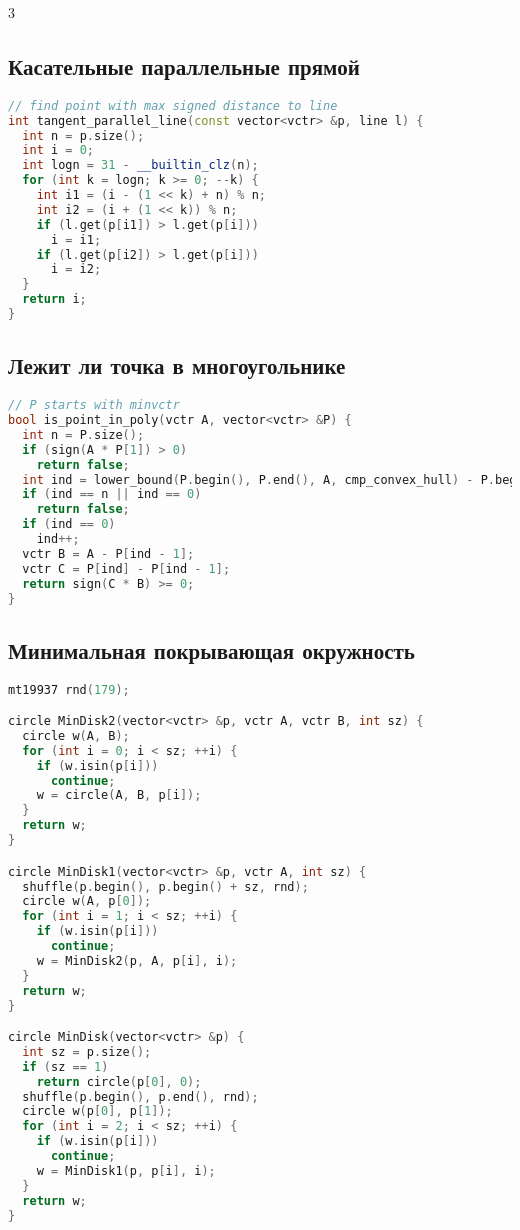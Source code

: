 \documentclass[10pt,a4paper,landscape,twosided]{extarticle}
\begin{document}
\begin{multicols*}{3}
\subsection{Касательные параллельные прямой}
\begin{lstlisting}[language=C++]
// find point with max signed distance to line
int tangent_parallel_line(const vector<vctr> &p, line l) {
  int n = p.size();
  int i = 0;
  int logn = 31 - __builtin_clz(n);
  for (int k = logn; k >= 0; --k) {
    int i1 = (i - (1 << k) + n) % n;
    int i2 = (i + (1 << k)) % n;
    if (l.get(p[i1]) > l.get(p[i]))
      i = i1;
    if (l.get(p[i2]) > l.get(p[i]))
      i = i2;
  }
  return i;
}

\end{lstlisting}

\subsection{Лежит ли точка в многоугольнике}
\begin{lstlisting}[language=C++]
// P starts with minvctr
bool is_point_in_poly(vctr A, vector<vctr> &P) {
  int n = P.size();
  if (sign(A * P[1]) > 0)
    return false;
  int ind = lower_bound(P.begin(), P.end(), A, cmp_convex_hull) - P.begin();
  if (ind == n || ind == 0)
    return false;
  if (ind == 0)
    ind++;
  vctr B = A - P[ind - 1];
  vctr C = P[ind] - P[ind - 1];
  return sign(C * B) >= 0;
}

\end{lstlisting}

\subsection{Минимальная покрывающая окружность}
\begin{lstlisting}[language=C++]
mt19937 rnd(179);

circle MinDisk2(vector<vctr> &p, vctr A, vctr B, int sz) {
  circle w(A, B);
  for (int i = 0; i < sz; ++i) {
    if (w.isin(p[i]))
      continue;
    w = circle(A, B, p[i]);
  }
  return w;
}

circle MinDisk1(vector<vctr> &p, vctr A, int sz) {
  shuffle(p.begin(), p.begin() + sz, rnd);
  circle w(A, p[0]);
  for (int i = 1; i < sz; ++i) {
    if (w.isin(p[i]))
      continue;
    w = MinDisk2(p, A, p[i], i);
  }
  return w;
}

circle MinDisk(vector<vctr> &p) {
  int sz = p.size();
  if (sz == 1)
    return circle(p[0], 0);
  shuffle(p.begin(), p.end(), rnd);
  circle w(p[0], p[1]);
  for (int i = 2; i < sz; ++i) {
    if (w.isin(p[i]))
      continue;
    w = MinDisk1(p, p[i], i);
  }
  return w;
}


\end{lstlisting}
\end{multicols*}
\end{document}
